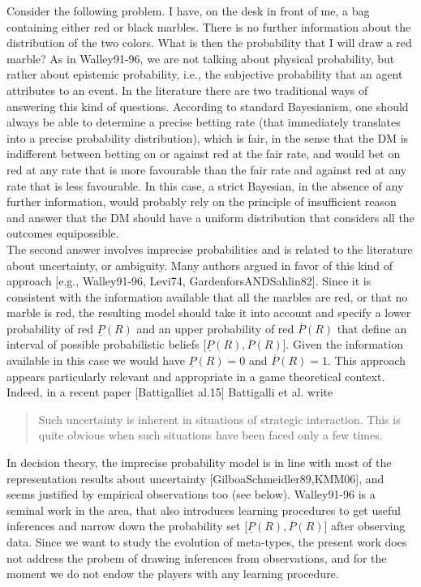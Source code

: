 \documentclass[fleqn,reqno,11pt]{article}
\begin{document}
Consider the following problem. I have, on the desk in front of me, a bag containing either red or black marbles. There is no further information about the distribution of the two colors. What is then the probability that I will draw a red marble? As in Walley91-96, we are not talking about physical probability, but rather about epistemic probability, i.e., the subjective probability that an agent attributes to an event.
In the literature there are two traditional ways of answering this kind of questions. According to standard Bayesianism, one should always be able to determine a precise betting rate (that immediately translates into a precise probability distribution), which is fair, in the sense that the DM is indifferent between betting on or against red at the fair rate, and would bet on red at any rate that is more favourable than the fair rate and against red at any rate that is less favourable. In this case, a strict Bayesian, in the absence of any further information, would probably rely on the principle of insufficient reason and answer that the DM should have a uniform distribution that considers all the outcomes equipossible. \\
The second answer involves imprecise probabilities and is related to the literature about uncertainty, or ambiguity. Many authors argued in favor of this kind of approach [e.g., Walley91-96, Levi74, GardenforsANDSahlin82]. Since it is consistent with the information available that all the marbles are red, or that no marble is red, the resulting model should take it into account and specify a lower probability of red $\underline{P}(R)$ and an upper probability of red $\overline{P}(R)$ that define an interval of possible probabilistic beliefs [$\underline{P}(R), \overline{P}(R)$]. Given the information available in this case we would have $\underline{P}(R)=0$ and $\overline{P}(R)=1$. This approach appears particularly relevant and appropriate in a game theoretical context. Indeed, in a recent paper [Battigalliet al.15] Battigalli et al. write
\begin{quote}
Such uncertainty is inherent in situations of strategic interaction. This is quite obvious when such situations have been faced only a few times.
\end{quote}
In decision theory, the imprecise probability model is in line with most of the representation results about uncertainty [GilboaSchmeidler89,KMM06], and seems justified by empirical observations too (see below). Walley91-96 is a seminal work in the area, that also introduces learning procedures to get useful inferences and narrow down the probability set [$\underline{P}(R), \overline{P}(R)$] after observing data. Since we want to study the evolution of meta-types, the present work does not address the probem of drawing inferences from observations, and for the moment we do not endow the players with any learning procedure.\\
\end{document}
